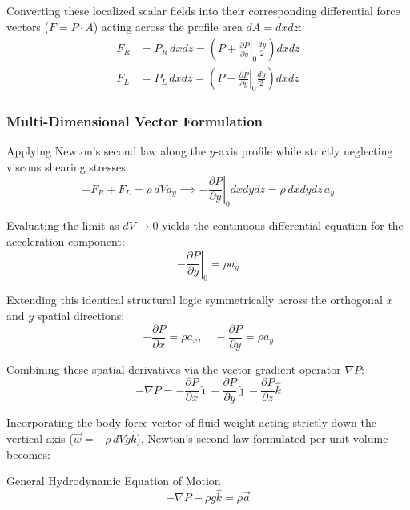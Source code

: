 Converting these localized scalar fields into their corresponding differential force vectors ($F = P \cdot A$) acting across the profile area $dA = dx dz$:
\begin{align}
    F_R &= P_R \, dx dz = \left(P + \left.\frac{\partial P}{\partial y}\right|_0 \frac{dy}{2}\right) dx dz \\
    F_L &= P_L \, dx dz = \left(P - \left.\frac{\partial P}{\partial y}\right|_0 \frac{dy}{2}\right) dx dz
\end{align}

\subsubsection{Multi-Dimensional Vector Formulation}

Applying Newton's second law along the $y$-axis profile while strictly neglecting viscous shearing stresses:
\begin{equation}
    -F_R + F_L = \rho \, dV a_y \implies -\left.\frac{\partial P}{\partial y}\right|_0 dx dy dz = \rho \, dx dy dz \, a_y
\end{equation}

Evaluating the limit as $dV \to 0$ yields the continuous differential equation for the acceleration component:
\begin{equation}
    -\left.\frac{\partial P}{\partial y}\right|_0 = \rho a_y
\end{equation}

Extending this identical structural logic symmetrically across the orthogonal $x$ and $y$ spatial directions:
\begin{equation}
    -\frac{\partial P}{\partial x} = \rho a_x, \quad -\frac{\partial P}{\partial y} = \rho a_y
\end{equation}

Combining these spatial derivatives via the vector gradient operator $\nabla P$:
\begin{equation}
    -\nabla P = -\frac{\partial P}{\partial x}\hat{\imath} - \frac{\partial P}{\partial y}\hat{\jmath} - \frac{\partial P}{\partial z}\hat{k}
\end{equation}

Incorporating the body force vector of fluid weight acting strictly down the vertical axis ($\vec{w} = -\rho \, dV g \hat{k}$), Newton's second law formulated per unit volume becomes:

\begin{eqbox}{General Hydrodynamic Equation of Motion}
\begin{equation}
    -\nabla P - \rho g \hat{k} = \rho \vec{a}
\end{equation}
\end{eqbox}

